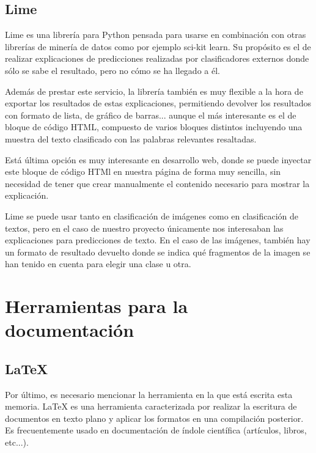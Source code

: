 \subsection{Lime}

Lime \cite{lime} es una librería para Python pensada para usarse en combinación con otras librerías de minería de datos como por ejemplo sci-kit learn. Su propósito es el de realizar explicaciones de predicciones realizadas por clasificadores externos donde sólo se sabe el resultado, pero no cómo se ha llegado a él. 

Además de prestar este servicio, la librería también es muy flexible a la hora de exportar los resultados de estas explicaciones, permitiendo devolver los resultados con formato de lista, de gráfico de barras... aunque el más interesante es el de bloque de código HTML, compuesto de varios bloques distintos incluyendo una muestra del texto clasificado con las palabras relevantes resaltadas. 

Está última opción es muy interesante en desarrollo web, donde se puede inyectar este bloque de código HTMl en nuestra página de forma muy sencilla, sin necesidad de tener que crear manualmente el contenido necesario para mostrar la explicación.

Lime se puede usar tanto en clasificación de imágenes como en clasificación de textos, pero en el caso de nuestro proyecto únicamente nos interesaban las explicaciones para predicciones de texto. En el caso de las imágenes, también hay un formato de resultado devuelto donde se indica qué fragmentos de la imagen se han tenido en cuenta para elegir una clase u otra.

\section{Herramientas para la documentación}

\subsection{\LaTeX}

Por último, es necesario mencionar la herramienta en la que está escrita esta memoria. \LaTeX{} \cite{lamport1994latex} es una herramienta caracterizada por realizar la escritura de documentos en texto plano y aplicar los formatos en una compilación posterior. Es frecuentemente usado en documentación de índole científica \cite{wiki:latex} (artículos, libros, etc...).